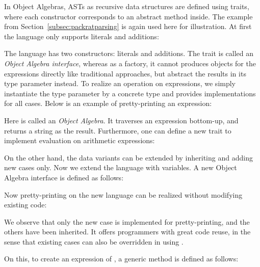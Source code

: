 In Object Algebras, ASTs as recursive data structures are defined using traits, where each constructor corresponds
to an abstract method inside. The example from Section~\ref{subsec:packratparsing} is again used here for illustration.
At first the language only supports literals and additions:

The language has two constructors: literals and additions. The trait  is called an \textit{Object Algebra interface},
whereas as a factory, it cannot produces objects for the expressions directly like traditional approaches, but abstract the results in its
type parameter  instead. To realize an operation on expressions, we simply instantiate the type parameter by a concrete type and
provides implementations for all cases. Below is an example of pretty-printing an expression:

Here  is called an \textit{Object Algebra}. It traverses an expression bottom-up, and returns a string as the result.
Furthermore, one can define a new trait to implement evaluation on arithmetic expressions:


On the other hand, the data variants can be extended by inheriting  and adding new cases only. Now we extend the language
with variables. A new Object Algebra interface  is defined as follows:

Now pretty-printing on the new language can be realized without modifying existing code:

We observe that only the new case is implemented for pretty-printing, and the others have been inherited.
It offers programmers with great code reuse, in the sense that existing cases can also be
overridden in  using .

On this, to create an expression of , a generic method is defined as follows:

